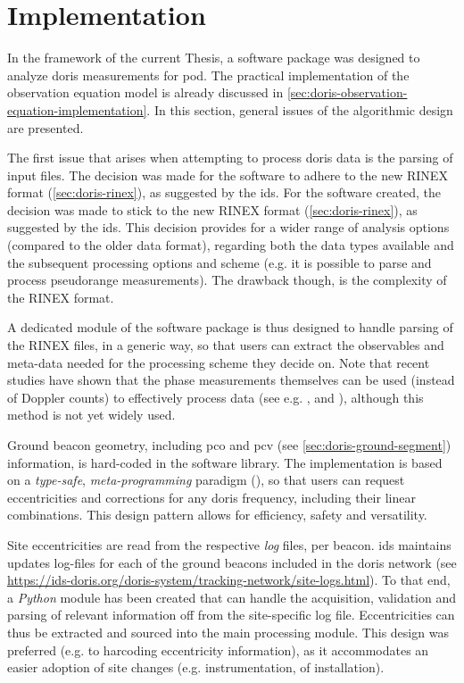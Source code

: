 \section{Implementation}\label{sec:doris-implementation}
In the framework of the current Thesis, a software package was designed to analyze 
\gls{doris} measurements for \gls{pod}. The practical implementation of the observation 
equation model is already discussed in \autoref{sec:doris-observation-equation-implementation}. 
In this section, general issues of the algorithmic design are presented.

The first issue that arises when attempting to process \gls{doris} data is the 
parsing of input files. The decision was made for the software to adhere to 
the new RINEX format (\autoref{sec:doris-rinex}), as suggested by the \gls{ids}.
For the software created, the decision was made to stick to the new 
RINEX format (\autoref{sec:doris-rinex}), as suggested by the \gls{ids}. This decision 
provides for a wider range of analysis options (compared to the older data format), 
regarding both the data types available and the subsequent processing options and 
scheme (e.g. it is possible to parse and process pseudorange measurements). The 
drawback though, is the complexity of the RINEX format.

A dedicated module of the software package is thus designed to handle parsing of the 
RINEX files, in a generic way, so that users can extract the observables and meta-data 
needed for the processing scheme they decide on. Note that recent studies have shown that 
the phase measurements themselves can be used (instead of Doppler counts) to effectively 
process data (see e.g. \cite{Mercier2010}, \cite{Dettmering2014} and \cite{Zhou2020}), 
although this method is not yet widely used.

Ground beacon geometry, including \gls{pco} and \gls{pcv} (see \autoref{sec:doris-ground-segment}) 
information, is hard-coded in the software library. The implementation is based on a 
\emph{type-safe}, \emph{meta-programming} paradigm (\cite{Vandevoorde2017}), so that 
users can request eccentricities and corrections for any \gls{doris} frequency, including 
their linear combinations. This design pattern allows for efficiency, safety and 
versatility.

Site eccentricities are read from the respective \emph{log} files, per beacon. 
\gls{ids} maintains updates log-files for each of the ground beacons included in 
the \gls{doris} network (see \url{https://ids-doris.org/doris-system/tracking-network/site-logs.html}). 
To that end, a \emph{Python} module has been created that can handle the acquisition, 
validation and parsing of relevant information off from the site-specific log file. 
Eccentricities can thus be extracted and sourced into the main processing module. 
This design was preferred (e.g. to harcoding eccentricity information), as it accommodates 
an easier adoption of site changes (e.g. instrumentation, of installation).

